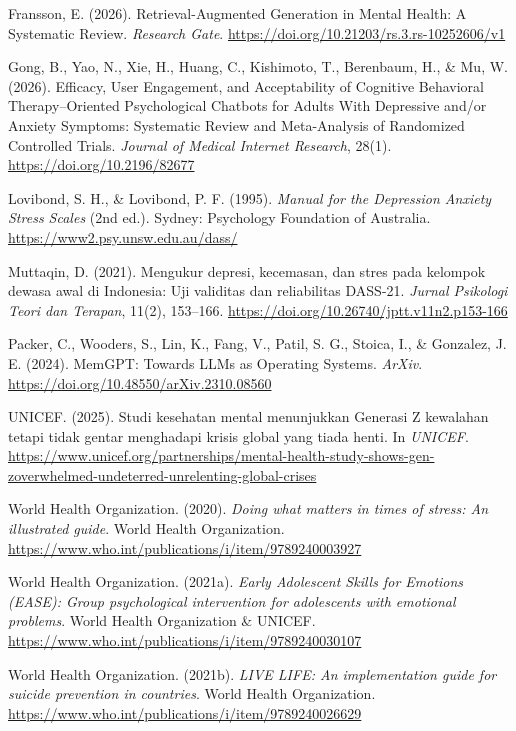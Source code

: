 Fransson, E. (2026). Retrieval-Augmented Generation in Mental Health: A Systematic Review. \textit{Research Gate}. \url{https://doi.org/10.21203/rs.3.rs-10252606/v1}\par

Gong, B., Yao, N., Xie, H., Huang, C., Kishimoto, T., Berenbaum, H., \& Mu, W. (2026). Efficacy, User Engagement, and Acceptability of Cognitive Behavioral Therapy--Oriented Psychological Chatbots for Adults With Depressive and/or Anxiety Symptoms: Systematic Review and Meta-Analysis of Randomized Controlled Trials. \textit{Journal of Medical Internet Research}, 28(1). \url{https://doi.org/10.2196/82677}\par

Lovibond, S. H., \& Lovibond, P. F. (1995). \textit{Manual for the Depression Anxiety Stress Scales} (2nd ed.). Sydney: Psychology Foundation of Australia. \url{https://www2.psy.unsw.edu.au/dass/}\par

Muttaqin, D. (2021). Mengukur depresi, kecemasan, dan stres pada kelompok dewasa awal di Indonesia: Uji validitas dan reliabilitas DASS-21. \textit{Jurnal Psikologi Teori dan Terapan}, 11(2), 153--166. \url{https://doi.org/10.26740/jptt.v11n2.p153-166}\par

Packer, C., Wooders, S., Lin, K., Fang, V., Patil, S. G., Stoica, I., \& Gonzalez, J. E. (2024). MemGPT: Towards LLMs as Operating Systems. \textit{ArXiv}. \url{https://doi.org/10.48550/arXiv.2310.08560}\par

UNICEF. (2025). Studi kesehatan mental menunjukkan Generasi Z kewalahan tetapi tidak gentar menghadapi krisis global yang tiada henti. In \textit{UNICEF}. \url{https://www.unicef.org/partnerships/mental-health-study-shows-gen-zoverwhelmed-undeterred-unrelenting-global-crises}\par

World Health Organization. (2020). \textit{Doing what matters in times of stress: An illustrated guide}. World Health Organization. \url{https://www.who.int/publications/i/item/9789240003927}\par

World Health Organization. (2021a). \textit{Early Adolescent Skills for Emotions (EASE): Group psychological intervention for adolescents with emotional problems}. World Health Organization \& UNICEF. \url{https://www.who.int/publications/i/item/9789240030107}\par

World Health Organization. (2021b). \textit{LIVE LIFE: An implementation guide for suicide prevention in countries}. World Health Organization. \url{https://www.who.int/publications/i/item/9789240026629}\par

\endgroup

